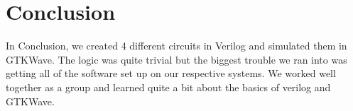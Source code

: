 \documentclass[12pt]{article}
\begin{document}
\section{Conclusion}

In Conclusion, we created 4 different circuits in Verilog and simulated them in GTKWave. The logic was quite trivial but the biggest trouble we ran into was getting all of the software set up on our respective systems. We worked well together as a group and learned quite a bit about the basics of verilog and GTKWave.
\end{document}
